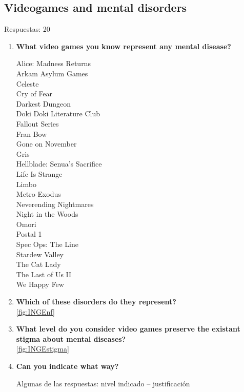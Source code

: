 \documentclass[12pt, a4paper,twoside,titlepage]{book}
\begin{document}
\subsection{Videogames and mental disorders}
Respuestas: 20
\begin{enumerate}[label=\textbf{\arabic*}.]
     \item \textbf{What video games you know represent any mental disease?}
     
    Alice: Madness Returns\\
    Arkam Asylum Games\\
    Celeste\\
    Cry of Fear\\
    Darkest Dungeon \\
    Doki Doki Literature Club\\
    Fallout Series\\
    Fran Bow\\
    Gone on November\\
    Gris\\
    Hellblade: Senua's Sacrifice\\
    Life Is Strange\\
    Limbo\\
    Metro Exodus\\
    Neverending Nightmares\\
    Night in the Woods\\
    Omori\\
    Postal 1\\
    Spec Ops: The Line\\
    Stardew Valley\\
    The Cat Lady\\
    The Last of Us II\\
    We Happy Few\\


     \item \textbf{Which of these disorders do they represent?}\\
     \ref{fig:INGEnf}
     \item \textbf{What level do you consider video games preserve the existant stigma about mental diseases?}\\
     \ref{fig:INGEstigma}
     \item \textbf{Can you indicate what way?}\\
     \label{estigmaIngles}
     
     Algunas de las respuestas: nivel indicado – justificación 


\end{enumerate}
\end{document}
